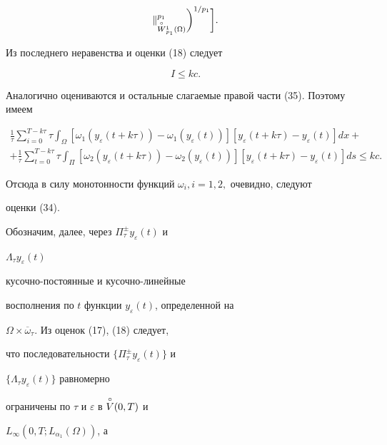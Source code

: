 \begin{pf}
\begin{gather*}
\|^{p_1}_{\oc W{}^1_{p_1}(\Omega)}\biggr )^{1/p_1}\biggr].


\end{gather*} 


Из последнего неравенства и оценки (18) следует 


\begin{equation} 


I \le kc. 


\end{equation} 


Аналогично оцениваются и остальные слагаемые правой части (35). Поэтому имеем 


\begin{gather*} 


\frac{1}{\tau}\sum^{T-k\tau}_{i=0}\tau\int_\Omega[\omega_1(y_\varepsilon 


(t+k\tau))-\omega_1(y_\varepsilon(t))] 


[y_\varepsilon(t+k\tau)-y_\varepsilon(t)]dx +\\


+\frac{1}{\tau}\sum^{T-k\tau}_{t=0}\tau\int_\Pi[\omega_2(y_\varepsilon 


(t+k\tau))-\omega_2(y_\varepsilon(t))] 


[y_\varepsilon(t+k\tau)-y_\varepsilon(t)]ds \le kc.


\end{gather*} 


Отсюда в силу монотонности функций $\omega_i, i=1,2,$ очевидно, следуют 


оценки (34).


\end{pf} 


 


Обозначим, далее, через $\Pi^{\pm}_\tau y_\varepsilon(t)$ и 


$\Lambda_\tau y_\varepsilon(t)$ 


кусочно-постоянные и кусочно-линейные 


восполнения по $t$ функции $y_\varepsilon(t)$, определенной на 


$\Omega\times\overline\omega_\tau$. Из оценок (17), (18) следует, 


что последовательности $\{\Pi^{\pm}_\tau y_\varepsilon(t)\}$ и 


$\{\Lambda_\tau y_\varepsilon(t)\}$ равномерно 


ограничены по $\tau$ и $\varepsilon$ в $\overset{\circ} V(0,T)$ и 


$L_\infty(0,T;L_{\alpha_1}(\Omega))$, а 


